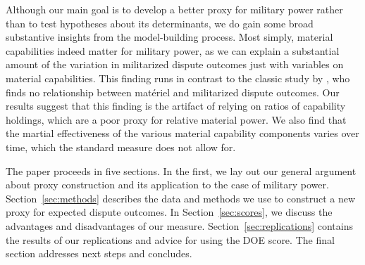 Although our main goal is to develop a better proxy for military power rather than to test hypotheses about its determinants, we do gain some broad substantive insights from the model-building process.
Most simply, material capabilities indeed matter for military power, as we can explain a substantial amount of the variation in militarized dispute outcomes just with variables on material capabilities.
This finding runs in contrast to the classic study by \citet{Maoz:1983cw}, who finds no relationship between matériel and militarized dispute outcomes.
Our results suggest that this finding is the artifact of relying on ratios of capability holdings, which are a poor proxy for relative material power.
We also find that the martial effectiveness of the various material capability components varies over time, which the standard measure does not allow for.

The paper proceeds in five sections.
In the first, we lay out our general argument about proxy construction and its application to the case of military power.
Section~\ref{sec:methods} describes the data and methods we use to construct a new proxy for expected dispute outcomes.
In Section~\ref{sec:scores}, we discuss the advantages and disadvantages of our measure.
Section~\ref{sec:replications} contains the results of our replications and advice for using the DOE score.
The final section addresses next steps and concludes.

